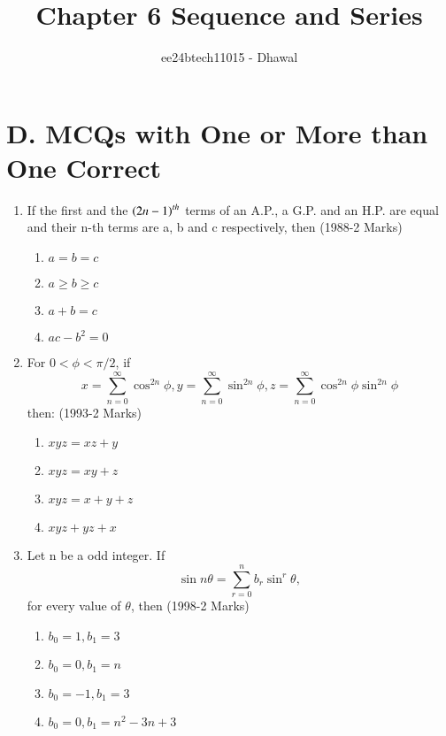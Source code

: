 \documentclass[journal,12pt,twocolumn]{IEEEtran}
\theoremstyle{remark}
\begin{document}

\vspace{3cm}

\title{Chapter 6 Sequence and Series}
\author{ee24btech11015 - Dhawal}
\maketitle
\newpage
\bigskip

\renewcommand{\thefigure}{\theenumi}
\renewcommand{\thetable}{\theenumi}

\section*{D. MCQs with One or More than One Correct}
\begin{enumerate}
    \item If the first and the $\left(2n-1\right)^{th} $ terms of an A.P., a G.P. and an H.P. are equal and their n-th terms are a, b and c respectively, then {(1988-2 Marks)}
\begin{multicols}{2}
\begin{enumerate}
\item $a=b=c$
\item $a \geq b \geq c$
\item $a+b=c$
\item $ac-b^2=0$
\end{enumerate}
\end{multicols}

\item For $0 < \phi < \pi /2$, if 
\begin{equation*}
x=\sum_{n=0}^{\infty} \cos^{2n} \phi ,
y=\sum_{n=0}^{\infty} \sin^{2n} \phi ,
z=\sum_{n=0}^{\infty} \cos^{2n} \phi \sin^{2n} \phi
\end{equation*}
then: \hfill{(1993-2 Marks)}
\begin{multicols}{2}
\begin{enumerate}
\item $xyz=xz+y$
\item $xyz=xy+z$
\item $xyz=x+y+z$
\item $xyz+yz+x$
\end{enumerate}
\end{multicols}

\item Let n be a odd integer. If 
\begin{equation*}
\sin n\theta= \sum_{r=0}^{n} b_r \sin^{r} \theta, 
\end{equation*}
for every value of $\theta$, then
\hfill{(1998-2 Marks)}
\begin{enumerate}
\item $b_0=1, b_1=3$
\item $b_0=0, b_1=n$
\item $b_0=-1, b_1=3$
\item $b_0=0, b_1=n^2-3n+3$
\end{enumerate}


\end{enumerate}
\end{document}
